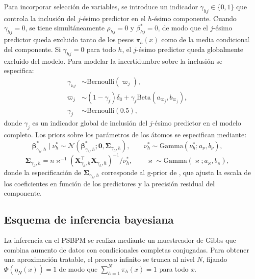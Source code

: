 Para incorporar selección de variables, se introduce un indicador $\gamma_{hj} \in \{0,1\}$ que controla la inclusión del $j$-ésimo predictor en el $h$-ésimo componente. Cuando $\gamma_{hj} = 0$, se tiene simultáneamente $\rho_{hj} = 0$ y $\beta_{hj}^* = 0$, de modo que el $j$-ésimo predictor queda excluido tanto de los pesos $\pi_h(x)$ como de la media condicional del componente. Si $\gamma_{hj} = 0$ para todo $h$, el $j$-ésimo predictor queda globalmente excluido del modelo. Para modelar la incertidumbre sobre la inclusión se especifica:
\begin{align}
    \gamma_{hj} &\sim \mathrm{Bernoulli}(\varpi_j), \label{eq:gamma_prior}\\
    \varpi_j &\sim (1 - \gamma_j)\delta_0
    + \gamma_j\mathrm{Beta}(a_{\varpi_j}, b_{\varpi_j}), \label{eq:kappa_prior}\\
    \gamma_j &\sim \mathrm{Bernoulli}(0.5), \label{eq:wj_prior}
\end{align}
donde $\gamma_j$ es un indicador global de inclusión del $j$-ésimo predictor en el modelo completo. Los priors sobre los parámetros de los átomos se especifican mediante:
\begin{equation}\label{eq:prior_theta}
    \boldsymbol{\beta}_{\gamma_h, h}^* \mid \nu_h^*
    \sim \mathcal{N}\!\left(\boldsymbol{\beta}_{\gamma_h,h}^*;
    \mathbf{0}, \boldsymbol{\Sigma}_{\gamma_h,h}\right),
    \qquad
    \nu_h^* \sim \mathrm{Gamma}(\nu_h^*; a_\nu, b_\nu),
\end{equation}
\begin{equation}\label{eq:sigma_gprior}
    \boldsymbol{\Sigma}_{\gamma_h,h} = n\varkappa^{-1}
    \left(\mathbf{X}_{\gamma_h,h}^\top
    \mathbf{X}_{\gamma_h,h}\right)^{-1}/\nu_h^*,
    \qquad
    \varkappa \sim \mathrm{Gamma}(\varkappa; a_\varkappa, b_\varkappa),
\end{equation}
donde la especificación de $\boldsymbol{\Sigma}_{\gamma_h,h}$ corresponde al g-prior de \citet{02_03_zellner1986gprior}, que ajusta la escala de los coeficientes en función de los predictores y la precisión residual del componente.
 
\subsection{Esquema de inferencia bayesiana}
\label{03_03_02_esquema_inferencia_bayesiana}
La inferencia en el PSBPM se realiza mediante un muestreador de Gibbs que combina aumento de datos con condicionales completas conjugadas. Para obtener una aproximación tratable, el proceso infinito se trunca al nivel $N$, fijando $\Phi(\eta_N(x)) = 1$ de modo que $\sum_{h=1}^{N}\pi_h(x) = 1$ para todo $x$.\\
 
